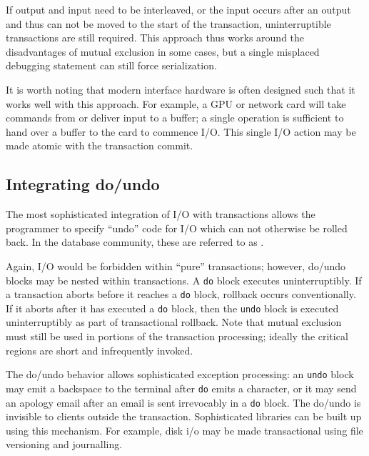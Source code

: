 If output and input need to be interleaved, or the input occurs after
an output and thus can not be moved to the start of the transaction,
uninterruptible transactions are still required.  This approach thus
works around the disadvantages of mutual exclusion in some cases, but
a single misplaced debugging statement can still force serialization.

It is worth noting that modern interface hardware is often designed
such that it works well with this approach.  For example, a GPU
or network card will take commands from or deliver input to a
buffer; a single operation is sufficient to hand over a buffer to
the card to commence I/O.  This single I/O action may be made atomic
with the transaction commit.

\subsection{Integrating do/undo}
The most sophisticated integration of I/O with transactions allows the
programmer to specify ``undo'' code for I/O which can not otherwise be
rolled back.  In the database community, these are referred to as
.

Again, I/O would be forbidden within ``pure'' transactions; however,
do/undo blocks may be nested within transactions.  A \texttt{do} block
executes uninterruptibly.  If a transaction aborts before it reaches a
\texttt{do} block, rollback occurs conventionally.  If it aborts after it
has executed a \texttt{do} block, then the \texttt{undo} block is
executed uninterruptibly as part of transactional rollback.  Note that
mutual exclusion must still be used in portions of the transaction
processing; ideally the critical regions are short and infrequently
invoked.

The do/undo behavior allows sophisticated exception processing: an
\texttt{undo} block may emit a backspace to the terminal after
\texttt{do} emits a character, or it may send an apology email after
an email is sent irrevocably in a \texttt{do} block.  The do/undo is
invisible to clients outside the transaction.  Sophisticated
libraries can be built up using this mechanism.  For example, disk i/o
may be made transactional using file versioning and journalling.

